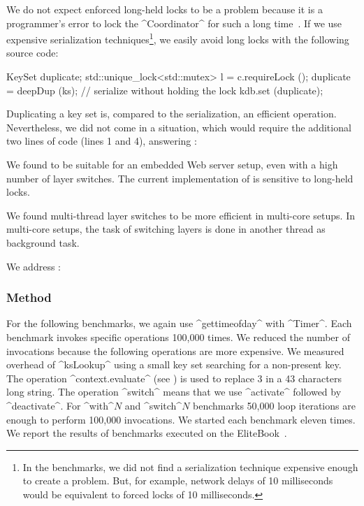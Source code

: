 We do not expect enforced long-held locks to be a problem because it is a programmer's error to lock the ^Coordinator^ for such a long time~\cite{raab2015global}.
If we use expensive serialization techniques\footnote{In the benchmarks, we did not find a serialization technique expensive enough to create a problem. But, for example, network delays of 10 milliseconds would be equivalent to forced locks of 10 milliseconds.}, we easily avoid long locks with the following source code:

\begin{code}[language=Cpp]
KeySet duplicate;
{
	std::unique_lock<std::mutex> l = c.requireLock ();
	duplicate = deepDup (ks);
}
// serialize without holding the lock
kdb.set (duplicate);
\end{code}

Duplicating a key set is, compared to the serialization, an efficient operation.
Nevertheless, we did not come in a situation, which would require the additional two lines of code (lines 1 and 4), answering :
\rqEvaluationFrontendMultiThreadOverhead*

\begin{finding}
We found \elektra{} to be suitable for an embedded Web server setup, even with a high number of layer switches.
The current implementation of \elektra{} is sensitive to long-held locks.

We found multi-thread layer switches to be more efficient in multi-core setups.
In multi-core setups, the task of switching layers is done in another thread as background task.
\end{finding}









We address :
\rqEvaluationFrontendPerformanceComparison*

\subsubsection{Method}

For the following benchmarks, we again use ^gettimeofday^ with ^Timer^.
Each benchmark invokes specific operations 100,000 times.
We reduced the number of invocations because the following operations are more expensive.
We measured overhead of ^ksLookup^ using a small key set searching for a non-present key.
The operation ^context.evaluate^ (see ) is used to replace 3  in a 43 characters long string.
The operation ^switch^ means that we use ^activate^ followed by ^deactivate^.
For ^with^$N$ and ^switch^$N$ benchmarks 50,000 loop iterations are enough to perform 100,000 invocations.
We started each benchmark eleven times.
We report the results of benchmarks executed on the EliteBook~\cite{raab2015global}.

